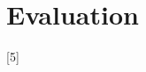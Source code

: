 \documentclass{llncs}
\begin{document}

\section{Evaluation}
\blindtext[2]
[5]
\blindtext[1]





\end{document}
